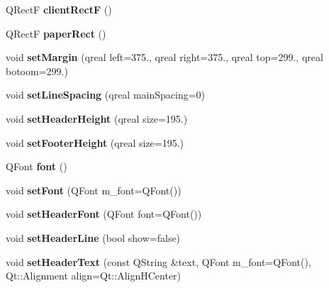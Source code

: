 \begin{DoxyCompactItemize}
\mbox{\label{class_q_qt_word_aba55c23328e49d6f6c9f33a33392837f}} 
Q\+RectF {\bfseries client\+RectF} ()
\item 
\mbox{\label{class_q_qt_word_a632c7b13c981d6a991df99f1630ddc65}} 
Q\+RectF {\bfseries paper\+Rect} ()
\item 
\mbox{\label{class_q_qt_word_a9e333f342f14507269672df2a024f6a6}} 
void {\bfseries set\+Margin} (qreal left=375., qreal right=375., qreal top=299., qreal botoom=299.)
\item 
\mbox{\label{class_q_qt_word_ada2b65ed81c9cf425f58f24f52d998f6}} 
void {\bfseries set\+Line\+Spacing} (qreal main\+Spacing=0)
\item 
\mbox{\label{class_q_qt_word_a1e423e3a5a53d20c6e9eaf36b0f2a0c5}} 
void {\bfseries set\+Header\+Height} (qreal size=195.)
\item 
\mbox{\label{class_q_qt_word_ac805940b023b707dda2d39174c5672fa}} 
void {\bfseries set\+Footer\+Height} (qreal size=195.)
\item 
\mbox{\label{class_q_qt_word_a3e01b1cc266ff351610618d6d9ce837a}} 
Q\+Font {\bfseries font} ()
\item 
\mbox{\label{class_q_qt_word_a9c0d7fec6a505e550b10608cb687234e}} 
void {\bfseries set\+Font} (Q\+Font m\+\_\+font=Q\+Font())
\item 
\mbox{\label{class_q_qt_word_acb5d7820719973d3928275d94466c361}} 
void {\bfseries set\+Header\+Font} (Q\+Font font=Q\+Font())
\item 
\mbox{\label{class_q_qt_word_a1406ec3c24c2d35d7ea625c89a74e855}} 
void {\bfseries set\+Header\+Line} (bool show=false)
\item 
\mbox{\label{class_q_qt_word_ae65d7ce638d7a2cd58fbce7adcfe54af}} 
void {\bfseries set\+Header\+Text} (const Q\+String \&text, Q\+Font m\+\_\+font=Q\+Font(), Qt\+::\+Alignment align=Qt\+::\+Align\+H\+Center)

\end{DoxyCompactItemize}
